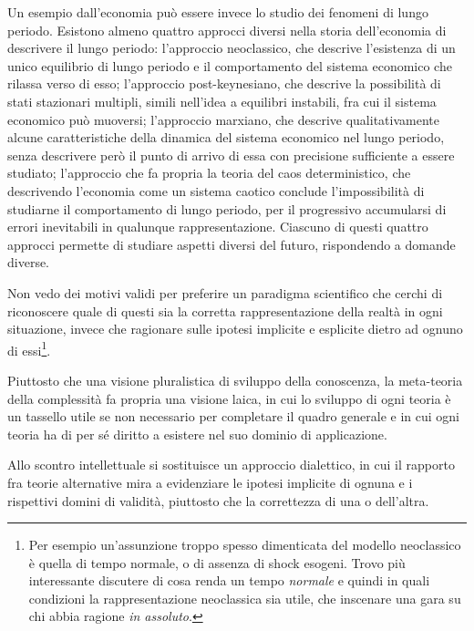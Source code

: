 \documentclass[a4paper, headings=standardclasses]{scrartcl}
\begin{document}
Un esempio dall'economia può essere invece lo studio dei fenomeni di lungo periodo.
Esistono almeno quattro approcci diversi nella storia dell'economia di descrivere il lungo periodo: l'approccio neoclassico, che descrive l'esistenza di un unico equilibrio di lungo periodo e il comportamento del sistema economico che rilassa verso di esso; l'approccio post-keynesiano, che descrive la possibilità di stati stazionari multipli, simili nell'idea a equilibri instabili, fra cui il sistema economico può muoversi; l'approccio marxiano, che descrive qualitativamente alcune caratteristiche della dinamica del sistema economico nel lungo periodo, senza descrivere però il punto di arrivo di essa con precisione sufficiente a essere studiato; l'approccio che fa propria la teoria del caos deterministico, che descrivendo l'economia come un sistema caotico conclude l'impossibilità di studiarne il comportamento di lungo periodo, per il progressivo accumularsi di errori inevitabili in qualunque rappresentazione.
Ciascuno di questi quattro approcci permette di studiare aspetti diversi del futuro, rispondendo a domande diverse.

Non vedo dei motivi validi per preferire un paradigma scientifico che cerchi di riconoscere quale di questi sia la corretta rappresentazione della realtà in ogni situazione, invece che ragionare sulle ipotesi implicite e esplicite dietro ad ognuno di essi\footnote{Per esempio un'assunzione troppo spesso dimenticata del modello neoclassico è quella di tempo normale, o di assenza di shock esogeni. Trovo più interessante discutere di cosa renda un tempo \textit{normale} e quindi in quali condizioni la rappresentazione neoclassica sia utile, che inscenare una gara su chi abbia ragione \textit{in assoluto}.}.

Piuttosto che una visione pluralistica di sviluppo della conoscenza, la meta-teoria della complessità fa propria una visione laica, in cui lo sviluppo di ogni teoria è un tassello utile se non necessario per completare il quadro generale e in cui ogni teoria ha di per sé diritto a esistere nel suo dominio di applicazione.

Allo scontro intellettuale si sostituisce un approccio dialettico, in cui il rapporto fra teorie alternative mira a evidenziare le ipotesi implicite di ognuna e i rispettivi domini di validità, piuttosto che la correttezza di una o dell'altra.
\end{document}
